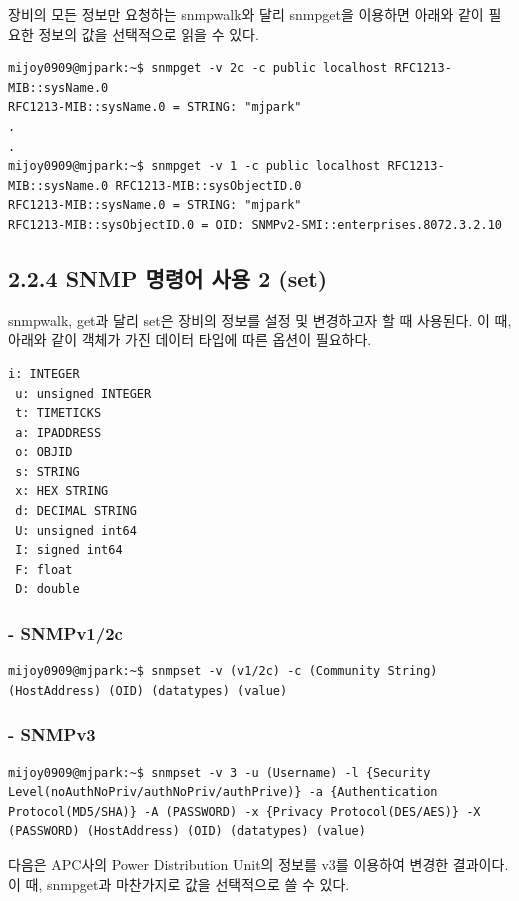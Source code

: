 \documentclass[11pt
  , a4paper
  , article
  , oneside
]{memoir}
\begin{document}
장비의 모든 정보만 요청하는 snmpwalk와 달리 snmpget을 이용하면 아래와 같이 필요한 정보의 값을 선택적으로 읽을 수 있다.
\begin{lstlisting}[style=termstyle]
mijoy0909@mjpark:~$ snmpget -v 2c -c public localhost RFC1213-MIB::sysName.0
RFC1213-MIB::sysName.0 = STRING: "mjpark"
.
.
mijoy0909@mjpark:~$ snmpget -v 1 -c public localhost RFC1213-MIB::sysName.0 RFC1213-MIB::sysObjectID.0
RFC1213-MIB::sysName.0 = STRING: "mjpark"
RFC1213-MIB::sysObjectID.0 = OID: SNMPv2-SMI::enterprises.8072.3.2.10
\end{lstlisting}

\subsection{2.2.4 SNMP 명령어 사용 2 (set)}

snmpwalk, get과 달리 set은 장비의 정보를 설정 및 변경하고자 할 때 사용된다. 이 때, 아래와 같이 객체가 가진 데이터 타입에 따른 옵션이 필요하다.

\begin{lstlisting}[style=termstyle]
 i: INTEGER 
 u: unsigned INTEGER 
 t: TIMETICKS
 a: IPADDRESS
 o: OBJID
 s: STRING
 x: HEX STRING
 d: DECIMAL STRING
 U: unsigned int64
 I: signed int64
 F: float
 D: double
\end{lstlisting}

\subsubsection{- SNMPv1/2c}

\begin{lstlisting}[style=termstyle]
mijoy0909@mjpark:~$ snmpset -v (v1/2c) -c (Community String) (HostAddress) (OID) (datatypes) (value)
\end{lstlisting}

\subsubsection{- SNMPv3}

\begin{lstlisting}[style=termstyle]
mijoy0909@mjpark:~$ snmpset -v 3 -u (Username) -l {Security Level(noAuthNoPriv/authNoPriv/authPrive)} -a {Authentication Protocol(MD5/SHA)} -A (PASSWORD) -x {Privacy Protocol(DES/AES)} -X (PASSWORD) (HostAddress) (OID) (datatypes) (value)
\end{lstlisting}

다음은 APC사의 Power Distribution Unit의 정보를 v3를 이용하여 변경한 결과이다. 이 때, snmpget과 마찬가지로 값을 선택적으로 쓸 수 있다.
\end{document}
